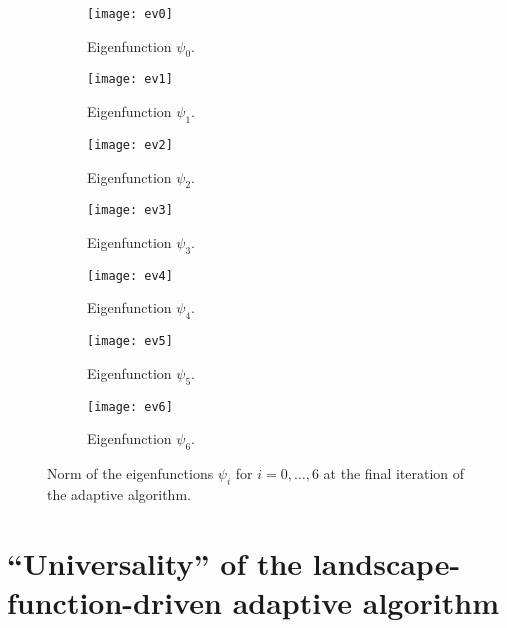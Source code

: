 \begin{figure}[htbp]
    \begin{subfigure}[t]{0.49\textwidth}
        \centering
        \texttt{[image: ev0]}
        \caption{Eigenfunction \(\psi_0\).}
        \label{fig:eigenfunction_0}
    \end{subfigure}
    \begin{subfigure}[t]{0.49\textwidth}
        \centering
        \texttt{[image: ev1]}
        \caption{Eigenfunction \(\psi_1\).}
        \label{fig:eigenfunction_1}
    \end{subfigure}
    \vspace{1cm}
    \begin{subfigure}[t]{0.49\textwidth}
        \centering
        \texttt{[image: ev2]}
        \caption{Eigenfunction \(\psi_2\).}
        \label{fig:eigenfunction_2}
    \end{subfigure}
    \begin{subfigure}[t]{0.49\textwidth}
        \centering
        \texttt{[image: ev3]}
        \caption{Eigenfunction \(\psi_3\).}
        \label{fig:eigenfunction_3}
    \end{subfigure}
    \vspace{1cm}
    \begin{subfigure}[t]{0.49\textwidth}
        \centering
        \texttt{[image: ev4]}
        \caption{Eigenfunction \(\psi_4\).}
        \label{fig:eigenfunction_4}
    \end{subfigure}
    \begin{subfigure}[t]{0.49\textwidth}
        \centering
        \texttt{[image: ev5]}
        \caption{Eigenfunction \(\psi_5\).}
        \label{fig:eigenfunction_5}
    \end{subfigure}
    \vspace{1cm}
    \begin{subfigure}[t]{0.49\textwidth}
        \centering
        \texttt{[image: ev6]}
        \caption{Eigenfunction \(\psi_6\).}
        \label{fig:eigenfunction_6}
    \end{subfigure}
    \caption{Norm of the eigenfunctions \(\psi_i\) for \(i = 0, \ldots, 6\) at the final iteration of the adaptive algorithm.}
\end{figure}


\section{``Universality'' of the landscape-function-driven adaptive algorithm}


